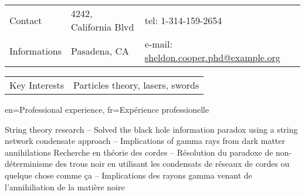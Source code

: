 \documentclass[letter]{article}
\author{Sheldon Cooper}
\begin{document}
\maketitle

\noindent
\begin{tabular}{p{3cm}p{8cm}p{7.5cm}}
{\small\sc Contact}       & 4242, California Blvd       & tel: 1-314-159-2654   \\
{\small\sc Informations}  & Pasadena, CA                & e-mail: \url{sheldon.cooper.phd@example.org} \vspace{0.5em}
\end{tabular}
\begin{tabular}{p{3cm}p{15cm}}
{\small\sc Key Interests} & Particles theory, lasers, swords \\
\end{tabular}

  
\begin{section}{en={Professional experience}, 
                fr={Expérience professionelle}}

    {String theory research \newline
     {\small
      \indent -- Solved the black hole information paradox using a string network condensate approach \newline
      \indent -- Implications of gamma rays from dark matter annihilations
     }
    }
    {Recherche en théorie des cordes \newline
     {\small
      \indent -- Résolution du paradoxe de non-déterminisme des trous noir en utilisant les condensats de réseaux de cordes ou quelque chose comme ça \newline
      \indent -- Implications des rayons gamma venant de l'annihiliation de la matière noire
     }
    }
\end{section}
\end{document}
